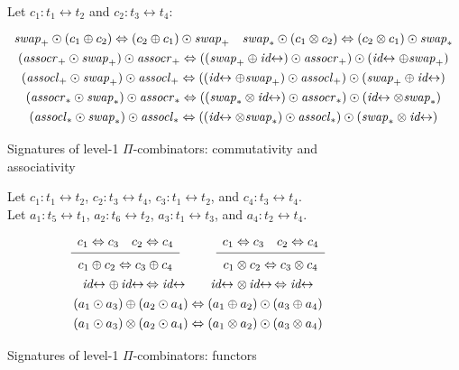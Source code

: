 \documentclass{article}
\newcommand{\swapp}{\mathit{swap}_+}
\newcommand{\assoclp}{\mathit{assocl}_+}
\newcommand{\assocrp}{\mathit{assocr}_+}
\newcommand{\swapt}{\mathit{swap}_*}
\newcommand{\assoclt}{\mathit{assocl}_*}
\newcommand{\assocrt}{\mathit{assocr}_*}
\newcommand{\idc}{\mathit{id}\!\!\leftrightarrow}
\newcommand{\Rule}[4]{
\makebox{{\rm #1}
$\displaystyle
\frac{\begin{array}{l}#2 \\\end{array}}
{\begin{array}{l}#3      \\\end{array}}$
 #4}}
\begin{document}
\begin{figure}[t]
Let $c_1 : t_1 \leftrightarrow t_2$ and $c_2 : t_3 \leftrightarrow t_4$:
\[\def\arraystretch{1.3}
\begin{array}{c}
  {\swapp \odot (c_1 \oplus c_2) \Leftrightarrow (c_2 \oplus c_1) \odot \swapp}
\quad
  {\swapt \odot (c_1 \otimes c_2) \Leftrightarrow (c_2 \otimes c_1) \odot \swapt}
\\
  {(\assocrp \odot \swapp) \odot \assocrp \Leftrightarrow ((\swapp \oplus \idc) \odot \assocrp) \odot (\idc \oplus \swapp)}
\\
  {(\assoclp \odot \swapp) \odot \assoclp \Leftrightarrow ((\idc \oplus \swapp) \odot \assoclp) \odot (\swapp \oplus \idc)}
\\
  {(\assocrt \odot \swapt) \odot \assocrt \Leftrightarrow ((\swapt \otimes \idc) \odot \assocrt) \odot (\idc \otimes \swapt)}
\\
  {(\assoclt \odot \swapt) \odot \assoclt \Leftrightarrow ((\idc \otimes \swapt) \odot \assoclt) \odot (\swapt \otimes \idc)}
\end{array}\]
\caption{\label{figf}Signatures of level-1 $\Pi$-combinators: commutativity and associativity}
\end{figure}

\begin{figure}[t]
Let $c_1 : t_1 \leftrightarrow t_2$, $c_2 : t_3 \leftrightarrow t_4$, $c_3 : t_1 \leftrightarrow t_2$, and $c_4 : t_3 \leftrightarrow t_4$. \\
Let $a_1 : t_5 \leftrightarrow t_1$,  $a_2 : t_6 \leftrightarrow t_2$, $a_3 : t_1 \leftrightarrow t_3$, and $a_4 : t_2 \leftrightarrow t_4$.
\[\def\arraystretch{1.3}
\begin{array}{c}
\Rule{}
  {c_1 \Leftrightarrow c_3 \quad c_2 \Leftrightarrow c_4}
  {c_1 \oplus c_2 \Leftrightarrow c_3 \oplus c_4}
  {}
\qquad
\Rule{}
  {c_1 \Leftrightarrow c_3 \quad c_2 \Leftrightarrow c_4}
  {c_1 \otimes c_2 \Leftrightarrow c_3 \otimes c_4}
  {}
\\
  {\idc \oplus \, \idc \, \Leftrightarrow \idc}
\qquad
  {\idc \otimes \, \idc \, \Leftrightarrow \idc}
\\
  {(a_1 \odot a_3) \oplus (a_2 \odot a_4) \Leftrightarrow (a_1 \oplus a_2) \odot (a_3 \oplus a_4)}
\\
  {(a_1 \odot a_3) \otimes (a_2 \odot a_4) \Leftrightarrow (a_1 \otimes a_2) \odot (a_3 \otimes a_4)}
\end{array}\]
\caption{\label{fige}Signatures of level-1 $\Pi$-combinators: functors}
\end{figure}
\end{document}
